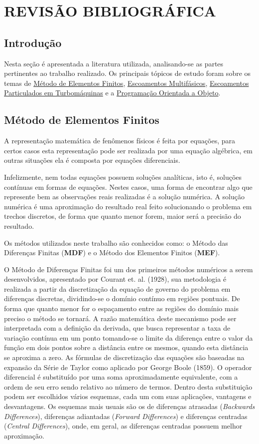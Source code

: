 \chapter{REVISÃO BIBLIOGRÁFICA}
\label{rev_bib}
\section{\textbf{Introdução}}
Nesta seção é apresentada a literatura utilizada, analisando-se as partes pertinentes ao trabalho realizado. Os principais tópicos de estudo foram sobre os temas de \hyperref[sec_rev_MEF]{Método de Elementos Finitos}, \hyperref[sec_rev_MF]{Escoamentos Multifásicos}, \hyperref[sec_rev_EP]{Escoamentos Particulados em Turbomáquinas} e a \hyperref[sec_rev_POO]{Programação Orientada a Objeto}.

\section{\textbf{Método de Elementos Finitos}}
\label{sec_rev_MEF}
A representação matemática de fenômenos físicos é feita por equações, para certos casos esta representação pode ser realizada por uma equação algébrica, em outras situações ela é composta por equações diferenciais.

Infelizmente, nem todas equações possuem soluções analíticas, isto é, soluções contínuas em formas de equações.
Nestes casos, uma forma de encontrar algo que represente bem as observações reais realizadas é a solução numérica.
A solução numérica é uma aproximação do resultado real feito solucionando o problema em trechos discretos, de forma que quanto menor forem, maior será a precisão do resultado.

Os métodos utilizados neste trabalho são conhecidos como: o Método das Diferenças Finitas (\textbf{MDF}) e o Método dos Elementos Finitos (\textbf{MEF}).

O Método de Diferenças Finitas foi um dos primeiros métodos numéricos a serem desenvolvidos, apresentado por Courant et. al. (1928)\cite{Courant-1928}, sua metodologia é realizada a partir da discretização da equação de governo do problema em diferenças discretas, dividindo-se o domínio contínuo em regiões pontuais.
De forma que quanto menor for o espaçamento entre as regiões do domínio mais preciso o método se tornará.
A razão matemática deste mecanismo pode ser interpretada com a definição da derivada, que busca representar a taxa de variação contínua em um ponto tomando-se o limite da diferença entre o valor da função em dois pontos sobre a distância entre os mesmos, quando esta distância se aproxima a zero.
As fórmulas de discretização das equações são baseadas na expansão da Série de Taylor como aplicado por George Boole (1859)\cite{Boole-1859}.
O operador diferencial é substituído por uma soma aproximadamente equivalente, com a ordem de seu erro sendo relativo ao número de termos.
Dentro desta substituição podem ser escolhidos vários esquemas, cada um com suas aplicações, vantagens e desvantagens.
Os esquemas mais usuais são os de diferenças atrasadas (\textit{Backwards Differences}), diferenças adiantadas (\textit{Forward Differences}) e diferenças centradas (\textit{Central Differences}), onde, em geral, as diferenças centradas possuem melhor aproximação.

